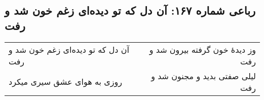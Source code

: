 \begin{center}
\section*{رباعی شماره ۱۶۷: آن دل که تو دیده‌ای زغم خون شد و رفت}
\label{sec:sh167}
\begin{longtable}{l p{0.5cm} r}
آن دل که تو دیده‌ای زغم خون شد و رفت
&&
وز دیدهٔ خون گرفته بیرون شد و رفت
\\
روزی به هوای عشق سیری میکرد
&&
لیلی صفتی بدید و مجنون شد و رفت
\\
\end{longtable}
\end{center}
